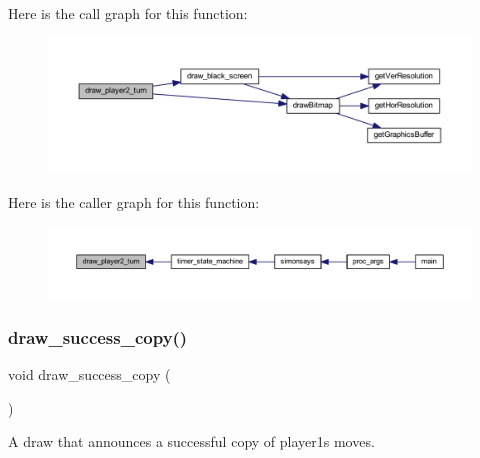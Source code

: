 Here is the call graph for this function\+:\nopagebreak
\begin{figure}[H]
\begin{center}
\leavevmode
\includegraphics[width=350pt]{group___bitmap_ga9af400ed66deb4c3aff712d9a7e9f522_cgraph}
\end{center}
\end{figure}
Here is the caller graph for this function\+:\nopagebreak
\begin{figure}[H]
\begin{center}
\leavevmode
\includegraphics[width=350pt]{group___bitmap_ga9af400ed66deb4c3aff712d9a7e9f522_icgraph}
\end{center}
\end{figure}
\mbox{\label{group___bitmap_gae696a3d4ee82a15e937f5f8c11fa9057}} 
\subsubsection{\texorpdfstring{draw\+\_\+success\+\_\+copy()}{draw\_success\_copy()}}
{\footnotesize\ttfamily void draw\+\_\+success\+\_\+copy (\begin{DoxyParamCaption}{ }\end{DoxyParamCaption})}



A draw that announces a successful copy of player1\textquotesingle{}s moves. 

\mbox{\label{group___bitmap_gabbf5153c909fc82e7734744352e22de9}} 
